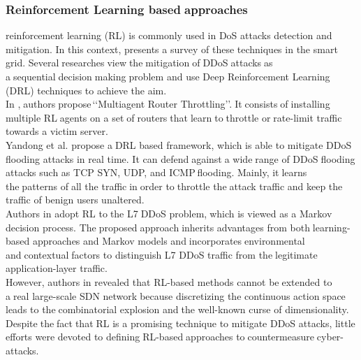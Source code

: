 \subsubsection{Reinforcement Learning based\textcolor{white}{.}approaches}
reinforcement learning (RL) is commonly used in DoS attacks detection and mitigation. In this context, \cite{dosRLReview} presents a survey of these techniques in the smart grid.
Several\textcolor{white}{.}researches\textcolor{white}{.}view\textcolor{white}{.}the\textcolor{white}{.}mitigation\textcolor{white}{.}of\textcolor{white}{.}DDoS\textcolor{white}{.}attacks\textcolor{white}{.}as a\textcolor{white}{.}sequential\textcolor{white}{.}decision\textcolor{white}{.}making\textcolor{white}{.}problem and use Deep Reinforcement Learning (DRL) techniques to achieve the aim. 
\\In \cite{rl1},\textcolor{white}{.}authors\textcolor{white}{.}propose\textcolor{white}{.}‘‘Multiagent Router Throttling’’.\textcolor{white}{.}It\textcolor{white}{.}consists\textcolor{white}{.}of\textcolor{white}{.}installing multiple RL\textcolor{white}{.}agents on a set\textcolor{white}{.}of\textcolor{white}{.}routers\textcolor{white}{.}that\textcolor{white}{.}learn\textcolor{white}{.}to\textcolor{white}{.}throttle or\textcolor{white}{.}rate-limit traffic towards a victim server. \\
Yandong et al. \cite{rl2} propose a\textcolor{white}{.}DRL based framework, which is able to mitigate DDoS flooding attacks in real time. It can defend\textcolor{white}{.}against\textcolor{white}{.}a wide\textcolor{white}{.}range of DDoS\textcolor{white}{.}flooding attacks such as TCP SYN, UDP, and ICMP\textcolor{white}{.}flooding. Mainly, it\textcolor{white}{.}learns the\textcolor{white}{.}patterns of\textcolor{white}{.}all the traffic\textcolor{white}{.}in\textcolor{white}{.}order to\textcolor{white}{.}throttle the\textcolor{white}{.}attack traffic and keep the traffic of benign users unaltered. \\
Authors in \cite{rl3} adopt RL to\textcolor{white}{.}the L7\textcolor{white}{.}DDoS problem,\textcolor{white}{.}which is viewed as a Markov decision process. The\textcolor{white}{.}proposed\textcolor{white}{.}approach\textcolor{white}{.}inherits advantages from both\textcolor{white}{.}learning-based approaches and Markov models and\textcolor{white}{.}incorporates\textcolor{white}{.}environmental and\textcolor{white}{.}contextual\textcolor{white}{.}factors to distinguish L7 DDoS traffic from the\textcolor{white}{.}legitimate application-layer traffic. \\
However, authors in \cite{rl2} revealed that RL-based methods cannot be\textcolor{white}{.}extended to a\textcolor{white}{.}real large-scale SDN network\textcolor{white}{.}because discretizing the continuous action space leads to the\textcolor{white}{.}combinatorial explosion and\textcolor{white}{.}the well-known curse of dimensionality. Despite\textcolor{white}{.}the\textcolor{white}{.}fact\textcolor{white}{.}that\textcolor{white}{.}RL is a promising technique to mitigate DDoS attacks, little efforts were devoted to defining\textcolor{white}{.}RL-based\textcolor{white}{.}approaches to\textcolor{white}{.}countermeasure\textcolor{white}{.}cyber-attacks. 


